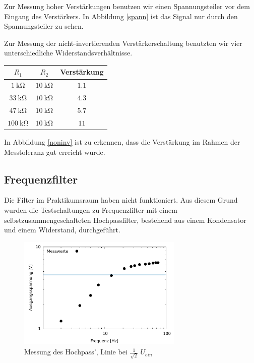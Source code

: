 Zur Messung hoher Verstärkungen benutzen wir einen Spannungsteiler vor dem
Eingang des Verstärkers. In Abbildung \ref{spann} ist das Signal nur durch den
Spannungsteiler zu sehen.\\

Zur Messung der nicht-invertierenden Verstärkerschaltung benutzten wir vier
unterschiedliche Widerstandsverhältnisse. 
	\begin{table}[H]
		\centering
		\begin{tabular}{|c c c|}
			\hline
			$R_1$ &$R_2$ &Verstärkung \\ \hline
			$\SI{1}{\kilo \ohm}$ &$\SI{10}{\kilo\ohm}$ &$1.1$ \\
			$\SI{33}{\kilo\ohm}$ &$\SI{10}{\kilo\ohm}$ &$4.3$ \\
			$\SI{47}{\kilo\ohm}$ &$\SI{10}{\kilo\ohm}$ &$5.7$ \\
			$\SI{100}{\kilo\ohm}$ &$\SI{10}{\kilo\ohm}$ &$11$ \\
			\hline
		\end{tabular}
	\end{table}

In Abbildung \ref{noninv} ist zu erkennen, dass die Verstärkung im Rahmen der Messtoleranz
gut erreicht wurde.\\

\subsection{Frequenzfilter}

Die Filter im Praktikumsraum haben nicht funktioniert. Aus diesem Grund wurden
die Testschaltungen zu Frequenzfilter mit einem selbstzusammengeschalteten
Hochpassfilter, bestehend aus einem Kondensator und einem Widerstand,
durchgeführt. \\
\begin{figure}[htb]
	\centering
	\includegraphics[width=0.7\textwidth]{Mess/hochpass.pdf}
	\caption{Messung des Hochpass', Linie bei $\frac{1}{\sqrt{2}} \; U_{ein}$}
	\label{hochuf}
\end{figure}

